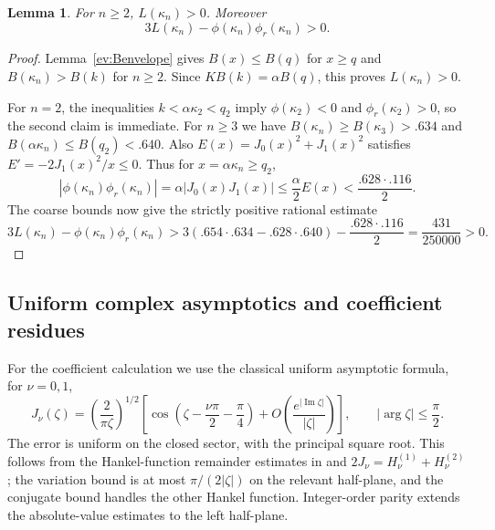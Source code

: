 \documentclass[11pt,letterpaper,reqno]{amsart}
\newtheorem{lemma}[theorem]{Lemma}
\theoremstyle{definition}
\begin{document}
\begin{lemma}\label{gm:residuepositive}
For $n\ge2$, $L(\kappa_n)>0$. Moreover
\[
 3L(\kappa_n)-\phi(\kappa_n)\phi_r(\kappa_n)>0.
\]
\end{lemma}
\begin{proof}
Lemma~\ref{ev:Benvelope} gives $B(x)\le B(q)$ for $x\ge q$ and
$B(\kappa_n)>B(k)$ for $n\ge2$. Since $KB(k)=\alpha B(q)$,
this proves $L(\kappa_n)>0$.

For $n=2$, the inequalities $k<\alpha\kappa_2<q_2$ imply
$\phi(\kappa_2)<0$ and $\phi_r(\kappa_2)>0$, so the second
claim is immediate. For $n\ge3$ we have
$B(\kappa_n)\ge B(\kappa_3)>.634$ and
$B(\alpha\kappa_n)\le B(q_2)<.640$. Also
$E(x)=J_0(x)^2+J_1(x)^2$ satisfies $E'=-2J_1(x)^2/x\le0$.
Thus for $x=\alpha\kappa_n\ge q_2$,
\[
 |\phi(\kappa_n)\phi_r(\kappa_n)|
 =\alpha|J_0(x)J_1(x)|\le\frac\alpha2 E(x)
 <\frac{.628\cdot.116}{2}.
\]
The coarse bounds now give the strictly positive rational estimate
\[
 3L(\kappa_n)-\phi(\kappa_n)\phi_r(\kappa_n)
 >3(.654\cdot.634-.628\cdot.640)-\frac{.628\cdot.116}2
 =\frac{431}{250000}>0.
\]
\end{proof}

\subsection{Uniform complex asymptotics and coefficient residues}
For the coefficient calculation we use the classical uniform asymptotic
formula, for $\nu=0,1$,
\begin{equation}\label{asym:uniformJ}
 J_\nu(\zeta)=\left(\frac2{\pi\zeta}\right)^{1/2}
 \left[\cos\left(\zeta-\frac{\nu\pi}2-\frac\pi4\right)
       +O\left(\frac{e^{|\operatorname{Im}\zeta|}}{|\zeta|}\right)\right],
 \qquad |\arg\zeta|\le\frac\pi2.
\end{equation}
The error is uniform on the closed sector, with the principal square
root. This follows from the Hankel-function remainder estimates in
\cite[\S10.17(iv), Eqs.~10.17.13--10.17.15]{DLMF} and
$2J_\nu=H_\nu^{(1)}+H_\nu^{(2)}$; the variation bound is at most
$\pi/(2|\zeta|)$ on the relevant half-plane, and the conjugate bound
handles the other Hankel function. Integer-order parity extends the
absolute-value estimates to the left half-plane.
\end{document}
